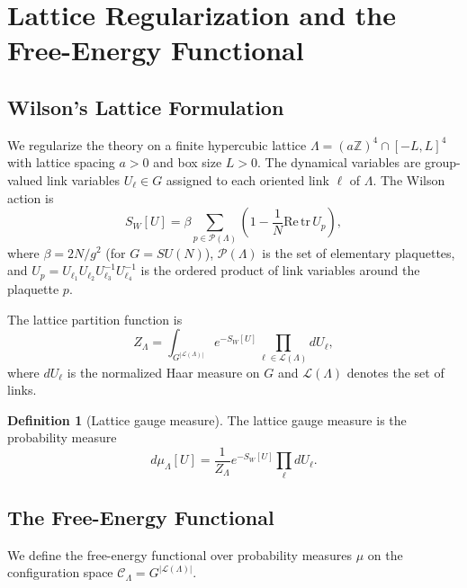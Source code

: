 \documentclass[12pt,a4paper]{article}
\theoremstyle{definition}
\newtheorem{definition}{Definition}[section]
\theoremstyle{plain}
\theoremstyle{remark}
\begin{document}
\section{Lattice Regularization and the Free-Energy Functional}

\subsection{Wilson's Lattice Formulation}

We regularize the theory on a finite hypercubic lattice $\Lambda = (a\mathbb{Z})^4 \cap [-L, L]^4$ with lattice spacing $a > 0$ and box size $L > 0$. The dynamical variables are group-valued link variables $U_\ell \in G$ assigned to each oriented link $\ell$ of $\Lambda$. The Wilson action is
\begin{equation}\label{eq:Wilson-action}
    S_W[U] = \beta \sum_{p \in \mathcal{P}(\Lambda)} \left(1 - \frac{1}{N} \mathrm{Re}\, \mathrm{tr}\, U_p \right),
\end{equation}
where $\beta = 2N/g^2$ (for $G = SU(N)$), $\mathcal{P}(\Lambda)$ is the set of elementary plaquettes, and $U_p = U_{\ell_1} U_{\ell_2} U_{\ell_3}^{-1} U_{\ell_4}^{-1}$ is the ordered product of link variables around the plaquette $p$.

The lattice partition function is
\begin{equation}
    Z_\Lambda = \int_{G^{|\mathcal{L}(\Lambda)|}} e^{-S_W[U]} \prod_{\ell \in \mathcal{L}(\Lambda)} dU_\ell,
\end{equation}
where $dU_\ell$ is the normalized Haar measure on $G$ and $\mathcal{L}(\Lambda)$ denotes the set of links.

\begin{definition}[Lattice gauge measure]
The lattice gauge measure is the probability measure
\begin{equation}
    d\mu_\Lambda[U] = \frac{1}{Z_\Lambda} e^{-S_W[U]} \prod_{\ell} dU_\ell.
\end{equation}
\end{definition}

\subsection{The Free-Energy Functional}

We define the free-energy functional over probability measures $\mu$ on the configuration space $\mathcal{C}_\Lambda = G^{|\mathcal{L}(\Lambda)|}$.
\end{document}
